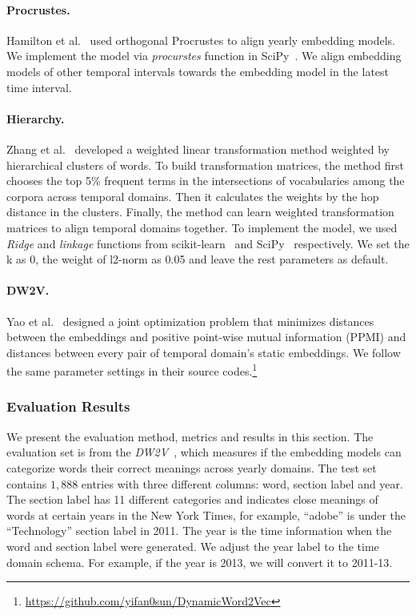 \paragraph{Procrustes.} 
Hamilton et al.~\cite{hamilton2016diachronic} used orthogonal Procrustes to align yearly embedding models. We implement the model via \textit{procurstes} function in SciPy~\cite{scipy_2001}. We align embedding models of other temporal intervals towards the embedding model in the latest time interval.

\paragraph{Hierarchy.} 
Zhang et al.~\cite{zhang2017temporal} developed a weighted linear transformation method weighted by hierarchical clusters of words. To build transformation matrices, the method first chooses the top 5\% frequent terms in the intersections of vocabularies among the corpora across temporal domains. Then it calculates the weights by the hop distance in the clusters. Finally, the method can learn weighted transformation matrices to align temporal domains together. To implement the model, we used \textit{Ridge} and \textit{linkage} functions from scikit-learn~\cite{pedregosa2011scikit} and SciPy~\cite{scipy_2001} respectively. We set the k as 0, the weight of l2-norm as 0.05 and leave the rest parameters as default.

\paragraph{DW2V.} 
Yao et al.~\cite{yao2018dynamic} designed a joint optimization problem that minimizes distances between the embeddings and positive point-wise mutual information (PPMI) and distances between every pair of temporal domain's static embeddings. We follow the same parameter settings in their source codes.\footnote{\url{https://github.com/yifan0sun/DynamicWord2Vec}}

\subsubsection{Evaluation Results}

We present the evaluation method, metrics and results in this section.
The evaluation set is from the \textit{DW2V}~\cite{yao2018dynamic}, which measures if the embedding models can categorize words their correct meanings across yearly domains. 
The test set contains $1,888$ entries with three different columns: word, section label and year.
The section label has 11 different categories and indicates close meanings of words at certain years in the New York Times, for example, ``adobe'' is under the ``Technology'' section label in 2011.
The year is the time information when the word and section label were generated.
We adjust the year label to the time domain schema.
For example, if the year is 2013, we will convert it to 2011-13.

